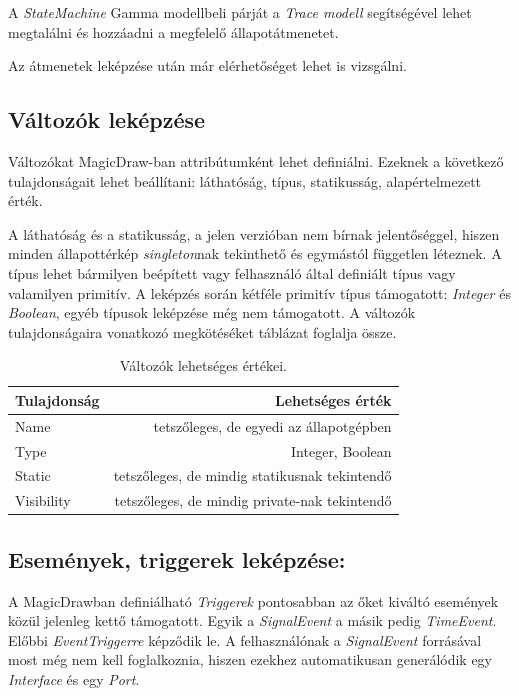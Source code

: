 A \emph{StateMachine} Gamma modellbeli párját a \emph{Trace modell} segítségével lehet megtalálni és hozzáadni a megfelelő állapotátmenetet.

Az átmenetek leképzése után már elérhetőséget lehet is vizsgálni.

\subsection{Változók leképzése}
Változókat MagicDraw-ban attribútumként lehet definiálni. Ezeknek a következő tulajdonságait lehet beállítani: láthatóság, típus, statikusság, alapértelmezett érték.

A láthatóság és a statikusság, a jelen verzióban nem bírnak jelentőséggel, hiszen minden állapottérkép \emph{singleton}nak tekinthető és egymástól független léteznek. A típus lehet bármilyen beépített vagy felhasználó által definiált típus vagy valamilyen primitív. A leképzés során kétféle primitív típus támogatott: \emph{Integer} és \emph{Boolean}, egyéb típusok leképzése még nem támogatott. A változók tulajdonságaira vonatkozó megkötéséket  táblázat foglalja össze.

\begin{table}[!h]
	\footnotesize
	\centering
	\begin{tabular}{ l r }
		Tulajdonság & Lehetséges érték\\ \hline
		Name & tetszőleges, de egyedi az állapotgépben\\
		Type & Integer, Boolean\\
		Static & tetszőleges, de mindig statikusnak tekintendő\\
		Visibility & tetszőleges, de mindig private-nak tekintendő
	\end{tabular}
	\caption{Változók lehetséges értékei.}
	\label{table:variables}
\end{table}



\subsection{Események, triggerek leképzése:} A MagicDrawban definiálható \emph{Triggerek} pontosabban az őket kiváltó események közül jelenleg kettő támogatott. Egyik a \emph{SignalEvent} a másik pedig \emph{TimeEvent}. Előbbi \emph{EventTriggerre} képződik le. A felhasználónak a \emph{SignalEvent} forrásával most még nem kell foglalkoznia, hiszen ezekhez automatikusan generálódik egy \emph{Interface} és egy \emph{Port}.

